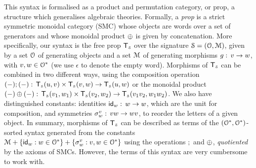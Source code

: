 This syntax is formalised as a product and permutation category, or prop, a structure which generalises algebraic theories. Formally, a \emph{prop} is a strict symmetric monoidal category (SMC) whose objects are words over a set of generators and whose monoidal product $\oplus$ is given by concatenation. 
More specifically, our syntax is the free prop $\mathsf{T}_{\scriptscriptstyle \mathcal{S}}$ over the signature $\mathcal{S} = (\mathcal{O},\mathcal{M})$, given by a set $\mathcal{O}$ of generating objects and a set $\mathcal{M}$  of generating morphisms $g\mathrel{:}\, v\to w$, with $v,w\in \mathcal{O}^*$ (we use $\epsilon$ to denote the empty word). Morphisms of  $\mathsf{T}_{\scriptscriptstyle \mathcal{S}}$ can be combined in two different ways, using the composition operation $(-);(-)\mathrel{:}\, \mathsf{T}_{\scriptscriptstyle \mathcal{S}}(u,v)\times \mathsf{T}_{\scriptscriptstyle \mathcal{S}}(v,w)\to \mathsf{T}_{\scriptscriptstyle \mathcal{S}}(u,w)$ or the monoidal product $(-)\oplus(-)\mathrel{:}\, \mathsf{T}_{\scriptscriptstyle \mathcal{S}}(v_1,w_1)\times \mathsf{T}_{\scriptscriptstyle \mathcal{S}}(v_2,w_2)\to \mathsf{T}_{\scriptscriptstyle \mathcal{S}}(v_1 v_2,w_1 w_2)$. We also have distinguished constants: identities $\mathsf{id}_w\mathrel{:}\, w\to w$, which are the unit for composition, and symmetries $\sigma^v_w\mathrel{:}\, vw\to wv$, to reorder the letters of a given object. In summary, morphisms of $\mathsf{T}_{\scriptscriptstyle \mathcal{S}}$ can be described as terms of the $(\mathcal{O}^*,\mathcal{O}^*)$-sorted syntax generated from the constants $\mathcal{M} + \{\mathsf{id}_w : w\in \mathcal{O}^*\}+ \{\sigma^v_w : v,w\in \mathcal{O}^*\}$ using the operations $;$ and $\oplus$, \emph{quotiented} by the axioms of SMCs. However, the terms of this syntax are very cumbersome to work with. 


